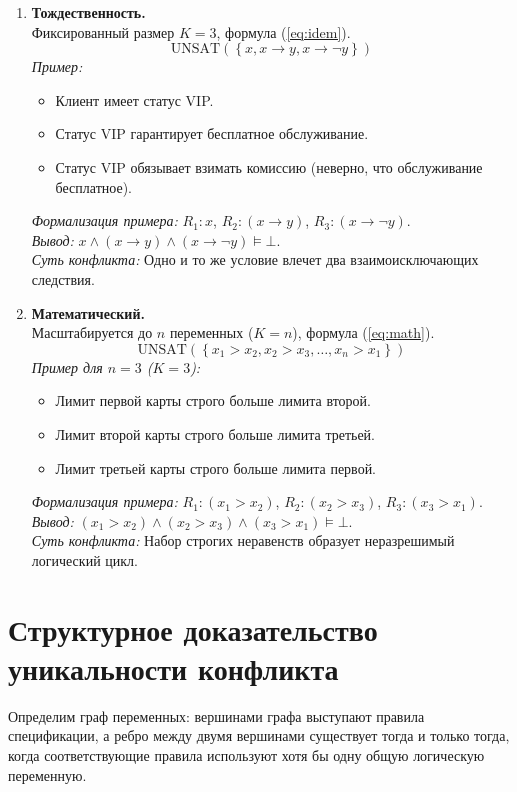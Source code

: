 \begin{enumerate}
\item \textbf{Тождественность.} \\
Фиксированный размер $K=3$, формула (\ref{eq:idem}).
\begin{equation} \label{eq:idem} \text{UNSAT}\left( \left\{ x, x \rightarrow y, x \rightarrow \neg y \right\} \right) \end{equation}
\textit{Пример:}
\begin{itemize}
    \item [$R_1$:] Клиент имеет статус VIP.
    \item [$R_2$:] Статус VIP гарантирует бесплатное обслуживание.
    \item [$R_3$:] Статус VIP обязывает взимать комиссию (неверно, что обслуживание бесплатное).
\end{itemize}
\textit{Формализация примера:} $R_1: x$, $R_2: (x \rightarrow y)$, $R_3: (x \rightarrow \neg y)$. \\
\textit{Вывод:} $x \land (x \rightarrow y) \land (x \rightarrow \neg y) \models \bot$. \\
\textit{Суть конфликта:} Одно и то же условие влечет два взаимоисключающих следствия.

\item \textbf{Математический.} \\
Масштабируется до $n$ переменных ($K=n$), формула (\ref{eq:math}).
\begin{equation} \label{eq:math} \text{UNSAT}\left( \left\{ x_1 > x_2, x_2 > x_3, \dots, x_n > x_1 \right\} \right) \end{equation}
\textit{Пример для $n=3$ ($K=3$):}
\begin{itemize}
    \item [$R_1$:] Лимит первой карты строго больше лимита второй.
    \item [$R_2$:] Лимит второй карты строго больше лимита третьей.
    \item [$R_3$:] Лимит третьей карты строго больше лимита первой.
\end{itemize}
\textit{Формализация примера:} $R_1: (x_1 > x_2)$, $R_2: (x_2 > x_3)$, $R_3: (x_3 > x_1)$. \\
\textit{Вывод:} $(x_1 > x_2) \land (x_2 > x_3) \land (x_3 > x_1) \models \bot$. \\
\textit{Суть конфликта:} Набор строгих неравенств образует неразрешимый логический цикл.
\end{enumerate}

\section{Структурное доказательство уникальности конфликта}
Определим граф переменных: вершинами графа выступают правила спецификации, а ребро между двумя вершинами существует тогда и только тогда, когда соответствующие правила используют хотя бы одну общую логическую переменную.

